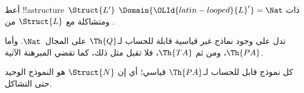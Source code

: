 \documentclass[../../../include/open-logic-section]{subfiles}
\begin{document}
\begin{prob}
أعط !!a{structure}~$\Struct{L'}$ ذات $\Domain{{\OLId{latin-looped}{L}}'}=\Nat$ ومتشاكلة مع
$\Struct{L}$ من .
\end{prob}

\begin{explain}
تدل  على وجود نماذج غير قياسية
قابلة للحساب لـ$\Th{Q}$ على المجال~$\Nat$.
وأما $\Th{PA}$، ومن ثم $\Th{TA}$، فلا تقبل مثل ذلك،
كما تقضي المبرهنة الآتية.
\end{explain}

\begin{thm}
كل نموذج قابل للحساب لـ$\Th{PA}$ قياسي؛ أي إن $\Struct{N}$ هو النموذج
الوحيد حتى التشاكل.
\end{thm}
\end{document}
